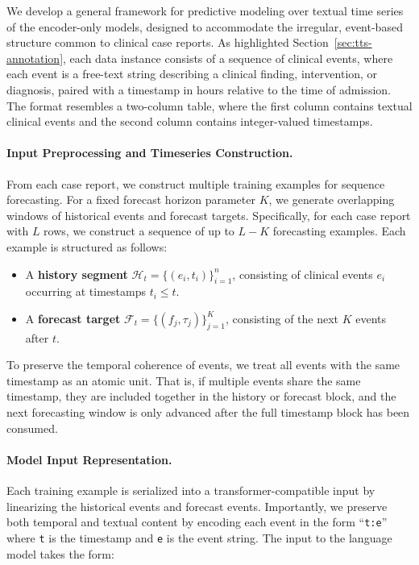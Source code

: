 We develop a general framework for predictive modeling over textual time series of the encoder-only models, designed to accommodate the irregular, event-based structure common to clinical case reports. 
As highlighted Section~\ref{sec:tts-annotation}, each data instance consists of a sequence of clinical events, where each event is a free-text string describing a clinical finding, intervention, or diagnosis, paired with a timestamp in hours relative to the time of admission. 
The format resembles a two-column table, where the first column contains textual clinical events and the second column contains integer-valued timestamps.

\paragraph{Input Preprocessing and Timeseries Construction.}
From each case report, we construct multiple training examples for sequence forecasting. 
For a fixed forecast horizon parameter $K$, we generate overlapping windows of historical events and forecast targets. 
Specifically, for each case report with $L$ rows, we construct a sequence of up to $L-K$ forecasting examples. 
Each example is structured as follows:

\begin{itemize}
    \item A \textbf{history segment} $\mathcal{H}_t = \{(e_i, t_i)\}_{i=1}^{n}$, consisting of clinical events $e_i$ occurring at timestamps $t_i \leq t$.
    \item A \textbf{forecast target} $\mathcal{F}_t = \{(f_j, \tau_j)\}_{j=1}^{K}$, consisting of the next $K$ events after $t$.
\end{itemize}

To preserve the temporal coherence of events, we treat all events with the same timestamp as an atomic unit. 
That is, if multiple events share the same timestamp, they are included together in the history or forecast block, and the next forecasting window is only advanced after the full timestamp block has been consumed.

\paragraph{Model Input Representation.}
Each training example is serialized into a transformer-compatible input by linearizing the historical events and forecast events. 
Importantly, we preserve both temporal and textual content by encoding each event in the form ``\texttt{t:e}'' where \texttt{t} is the timestamp and \texttt{e} is the event string.
The input to the language model takes the form:


